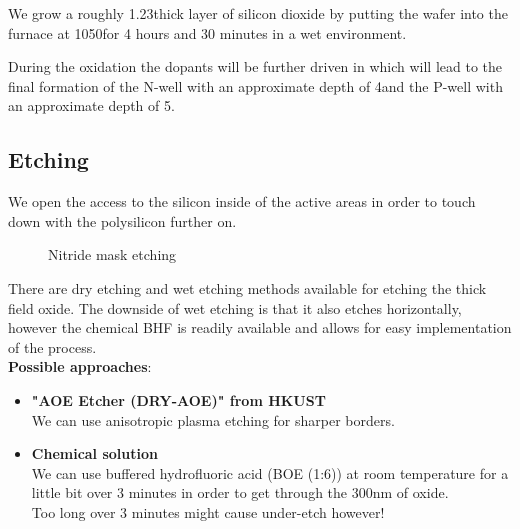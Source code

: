 We grow a roughly 1.23\um thick layer of silicon dioxide by putting the wafer into the furnace at 1050\degreesC for 4 hours and 30 minutes in a wet environment.

During the oxidation the dopants will be further driven in which will lead to the final formation of the N-well with an approximate depth of 4\um and the P-well with an approximate depth of 5\um.

\newpage

\subsection{Etching}\label{fox_etch}

We open the access to the silicon inside of the active areas in order to touch down with the polysilicon further on.

\begin{figure}[H]
	\centering
	\begin{tikzpicture}[node distance = 3cm, auto, thick,scale=\CrossSectionOnly, every node/.style={transform shape}]
		
	\end{tikzpicture}
	\drawStepArrow{}
	\begin{tikzpicture}[node distance = 3cm, auto, thick,scale=\CrossSectionOnly, every node/.style={transform shape}]
		
	\end{tikzpicture}
	\caption{Nitride mask etching}
\end{figure}

There are dry etching and wet etching methods available for etching the thick field oxide.
The downside of wet etching is that it also etches horizontally, however the chemical BHF is readily available and allows for easy implementation of the process.\\

\textbf{Possible approaches}:
\begin{itemize}
	\item \textbf{"AOE Etcher (DRY-AOE)" from HKUST} \\
	We can use anisotropic plasma etching for sharper borders.
	\item \textbf{Chemical solution} \\
	We can use buffered hydrofluoric acid (BOE (1:6)) at room temperature for a little bit over 3 minutes in order to get through the 300nm of oxide.\\
	Too long over 3 minutes might cause under-etch however!
\end{itemize}

\newpage
